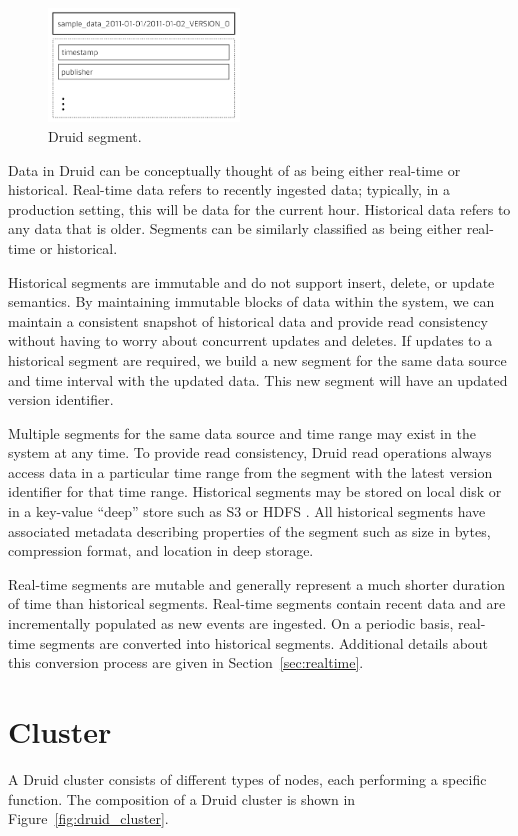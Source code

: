 \documentclass{vldb}
\begin{document}
\begin{figure}
\centering
\includegraphics[width = 2in]{druid_segment}
\caption{Druid segment.}
\label{fig:druid_segment}
\end{figure}

Data in Druid can be conceptually thought of as being either real-time
or historical. Real-time data refers to recently ingested data;
typically, in a production setting, this will be data for the current
hour. Historical data refers to any data that is older. Segments can
be similarly classified as being either real-time or historical.

Historical segments are immutable and do not support insert, delete,
or update semantics. By maintaining immutable blocks of data within
the system, we can maintain a consistent snapshot of historical
data and provide read consistency without having to worry about
concurrent updates and deletes. If updates to a historical segment are
required, we build a new segment for the same data source and time
interval with the updated data. This new segment will have an updated version identifier.

Multiple segments for the same data source and time range
may exist in the system at any time. To provide read consistency,
Druid read operations always access data in a particular time range
from the segment with the latest version identifier for that time
range. Historical segments may be stored on local disk or in a
key-value “deep” store such as S3 \cite{decandia2007dynamo} or HDFS \cite{shvachko2010hadoop}. All historical
segments have associated metadata describing properties of the segment
such as size in bytes, compression format, and location in deep
storage.

Real-time segments are mutable and generally represent a much shorter
duration of time than historical segments. Real-time segments contain
recent data and are incrementally populated as new events are
ingested. On a periodic basis, real-time segments are converted into
historical segments. Additional details about this conversion process
are given in Section~\ref{sec:realtime}.

\section{Cluster}
\label{sec:cluster}
A Druid cluster consists of different types of nodes, each performing
a specific function. The composition of a Druid cluster is shown in
Figure~\ref{fig:druid_cluster}.
\end{document}
